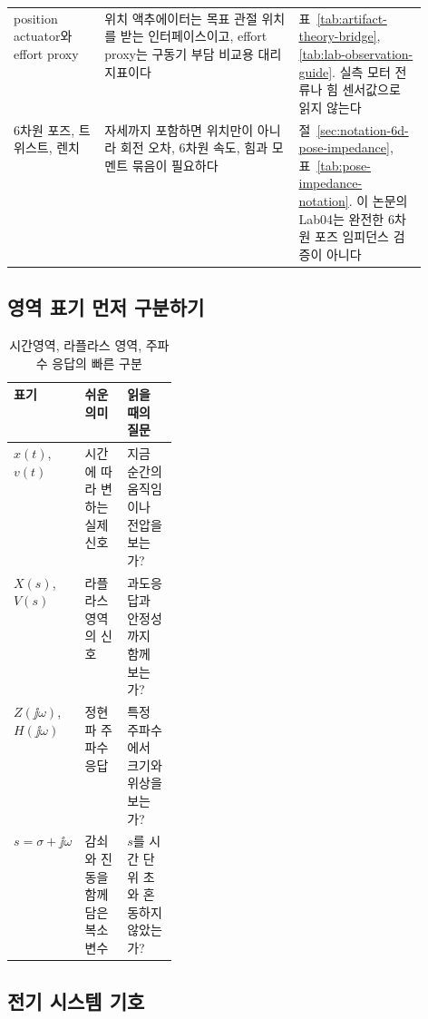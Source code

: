 \begin{table}[H]
\begin{tabularx}{\linewidth}{@{}>{\raggedright\arraybackslash}p{0.22\linewidth}>{\raggedright\arraybackslash}X>{\raggedright\arraybackslash}p{0.31\linewidth}@{}}
    position actuator와 effort proxy & 위치 액추에이터는 목표 관절 위치를 받는 인터페이스이고, effort proxy는 구동기 부담 비교용 대리 지표이다 & 표~\ref{tab:artifact-theory-bridge}, \ref{tab:lab-observation-guide}. 실측 모터 전류나 힘 센서값으로 읽지 않는다 \\
    6차원 포즈, 트위스트, 렌치 & 자세까지 포함하면 위치만이 아니라 회전 오차, 6차원 속도, 힘과 모멘트 묶음이 필요하다 & 절~\ref{sec:notation-6d-pose-impedance}, 표~\ref{tab:pose-impedance-notation}. 이 논문의 Lab04는 완전한 6차원 포즈 임피던스 검증이 아니다 \\
    \bottomrule
  \end{tabularx}
\end{table}

\subsection{영역 표기 먼저 구분하기}

\begin{table}[H]
  \centering
  \caption{시간영역, 라플라스 영역, 주파수 응답의 빠른 구분}
  \small
  \setlength{\tabcolsep}{4pt}
  \begin{tabularx}{\linewidth}{@{}>{\raggedright\arraybackslash}p{0.21\linewidth}>{\raggedright\arraybackslash}X>{\raggedright\arraybackslash}X@{}}
    \toprule
    표기 & 쉬운 의미 & 읽을 때의 질문 \\
    \midrule
    $x(t)$, $v(t)$ & 시간에 따라 변하는 실제 신호 & 지금 순간의 움직임이나 전압을 보는가? \\
    $X(s)$, $V(s)$ & 라플라스 영역의 신호 & 과도응답과 안정성까지 함께 보는가? \\
    $Z(\jj\omega)$, $H(\jj\omega)$ & 정현파 주파수 응답 & 특정 주파수에서 크기와 위상을 보는가? \\
    $s=\sigma+\jj\omega$ & 감쇠와 진동을 함께 담은 복소 변수 & $s$를 시간 단위 초와 혼동하지 않았는가? \\
    \bottomrule
  \end{tabularx}
\end{table}

\subsection{전기 시스템 기호}

